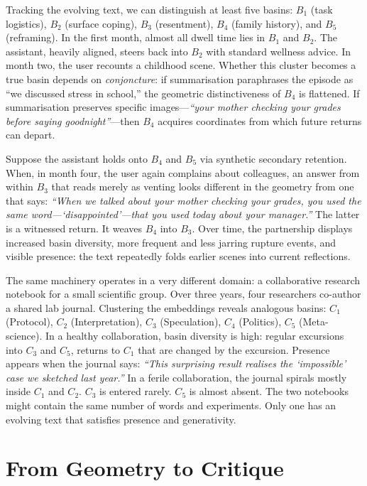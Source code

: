 Tracking the evolving text, we can distinguish at least five basins: $B_1$ (task logistics), $B_2$ (surface coping), $B_3$ (resentment), $B_4$ (family history), and $B_5$ (reframing). In the first month, almost all dwell time lies in $B_1$ and $B_2$. The assistant, heavily aligned, steers back into $B_2$ with standard wellness advice. In month two, the user recounts a childhood scene. Whether this cluster becomes a true basin depends on \emph{conjoncture}: if summarisation paraphrases the episode as ``we discussed stress in school,'' the geometric distinctiveness of $B_4$ is flattened. If summarisation preserves specific images---\emph{``your mother checking your grades before saying goodnight''}---then $B_4$ acquires coordinates from which future returns can depart.

Suppose the assistant holds onto $B_4$ and $B_5$ via synthetic secondary retention. When, in month four, the user again complains about colleagues, an answer from within $B_3$ that reads merely as venting looks different in the geometry from one that says: \emph{``When we talked about your mother checking your grades, you used the same word---`disappointed'---that you used today about your manager.''} The latter is a witnessed return. It weaves $B_4$ into $B_3$. Over time, the partnership displays increased basin diversity, more frequent and less jarring rupture events, and visible presence: the text repeatedly folds earlier scenes into current reflections.

The same machinery operates in a very different domain: a collaborative research notebook for a small scientific group. Over three years, four researchers co-author a shared lab journal. Clustering the embeddings reveals analogous basins: $C_1$ (Protocol), $C_2$ (Interpretation), $C_3$ (Speculation), $C_4$ (Politics), $C_5$ (Meta-science). In a healthy collaboration, basin diversity is high: regular excursions into $C_3$ and $C_5$, returns to $C_1$ that are changed by the excursion. Presence appears when the journal says: \emph{``This surprising result realises the `impossible' case we sketched last year.''} In a ferile collaboration, the journal spirals mostly inside $C_1$ and $C_2$. $C_3$ is entered rarely. $C_5$ is almost absent. The two notebooks might contain the same number of words and experiments. Only one has an evolving text that satisfies presence and generativity.


\section{From Geometry to Critique}

